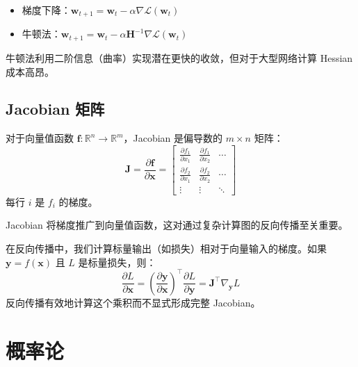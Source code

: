 \begin{示例}
\begin{itemize}
    \item 梯度下降：$\mathbf{w}_{t+1} = \mathbf{w}_t - \alpha \nabla \mathcal{L}(\mathbf{w}_t)$
    \item 牛顿法：$\mathbf{w}_{t+1} = \mathbf{w}_t - \alpha \mathbf{H}^{-1} \nabla \mathcal{L}(\mathbf{w}_t)$
\end{itemize}
牛顿法利用二阶信息（曲率）实现潜在更快的收敛，但对于大型网络计算 Hessian 成本高昂。
\end{示例}

\subsection{Jacobian 矩阵}

\begin{定义}[Jacobian]
对于向量值函数 $\mathbf{f}: \mathbb{R}^n \to \mathbb{R}^m$，Jacobian 是偏导数的 $m \times n$ 矩阵：
\begin{equation}
\mathbf{J} = \frac{\partial \mathbf{f}}{\partial \mathbf{x}} = \begin{bmatrix}
\frac{\partial f_1}{\partial x_1} & \frac{\partial f_1}{\partial x_2} & \cdots \\
\frac{\partial f_2}{\partial x_1} & \frac{\partial f_2}{\partial x_2} & \cdots \\
\vdots & \vdots & \ddots
\end{bmatrix}
\end{equation}
每行 $i$ 是 $f_i$ 的梯度。
\end{定义}

Jacobian 将梯度推广到向量值函数，这对通过复杂计算图的反向传播至关重要。

\begin{示例}
在反向传播中，我们计算标量输出（如损失）相对于向量输入的梯度。如果 $\mathbf{y} = f(\mathbf{x})$ 且 $L$ 是标量损失，则：
\begin{equation}
\frac{\partial L}{\partial \mathbf{x}} = \left(\frac{\partial \mathbf{y}}{\partial \mathbf{x}}\right)^\top \frac{\partial L}{\partial \mathbf{y}} = \mathbf{J}^\top \nabla_{\mathbf{y}} L
\end{equation}
反向传播有效地计算这个乘积而不显式形成完整 Jacobian。
\end{示例}

\section{概率论}

